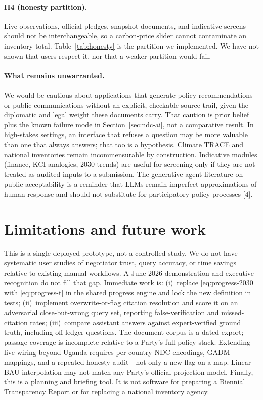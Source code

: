 \documentclass{article}
\begin{document}
\paragraph{H4 (honesty partition).}
Live observations, official pledges, snapshot documents, and indicative screens should not be interchangeable, so a carbon-price slider cannot contaminate an inventory total. Table~\ref{tab:honesty} is the partition we implemented. We have not shown that users respect it, nor that a weaker partition would fail.

\paragraph{What remains unwarranted.}
We would be cautious about applications that generate policy recommendations or public communications without an explicit, checkable source trail, given the diplomatic and legal weight these documents carry. That caution is prior belief plus the known failure mode in Section~\ref{sec:ndc-ai}, not a comparative result. In high-stakes settings, an interface that refuses a question may be more valuable than one that always answers; that too is a hypothesis. Climate TRACE and national inventories remain incommensurable by construction. Indicative modules (finance, KCI analogies, 2030 trends) are useful for screening only if they are not treated as audited inputs to a submission. The generative-agent literature on public acceptability is a reminder that LLMs remain imperfect approximations of human response and should not substitute for participatory policy processes [4].

\section{Limitations and future work}
\label{sec:limitations}

This is a single deployed prototype, not a controlled study. We do not have systematic user studies of negotiator trust, query accuracy, or time savings relative to existing manual workflows. A June 2026 demonstration and executive recognition do not fill that gap. Immediate work is: (i)~replace \eqref{eq:progress-2030} with \eqref{eq:progress-t} in the shared progress engine and lock the new definition in tests; (ii)~implement overwrite-or-flag citation resolution and score it on an adversarial close-but-wrong query set, reporting false-verification and missed-citation rates; (iii)~compare assistant answers against expert-verified ground truth, including off-ledger questions. The document corpus is a dated export; passage coverage is incomplete relative to a Party's full policy stack. Extending live wiring beyond Uganda requires per-country NDC encodings, GADM mappings, and a repeated honesty audit---not only a new flag on a map. Linear BAU interpolation may not match any Party's official projection model. Finally, this is a planning and briefing tool. It is not software for preparing a Biennial Transparency Report or for replacing a national inventory agency.
\end{document}
